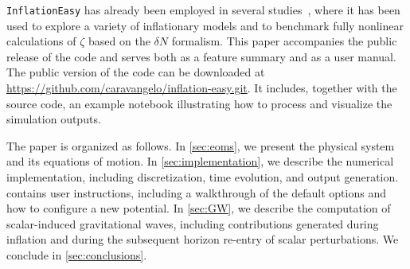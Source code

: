 \documentclass[aps, nofootinbib,superscriptaddress, preprintnumbers, longbibliography]{article}
\begin{document}
\texttt{InflationEasy} has already been employed in several studies~\cite{Caravano:2021pgc,Caravano:2022yyv,Caravano:2024tlp,Caravano:2024moy,Caravano:2025diq,gwpaper}, where it has been used to explore a variety of inflationary models and to benchmark fully nonlinear calculations of $\zeta$ based on the $\delta N$ formalism. This paper accompanies the public release of the code and serves both as a feature summary and as a user manual. The public version of the code can be downloaded at \href{https://github.com/caravangelo/inflation-easy.git}{https://github.com/caravangelo/inflation-easy.git}. It includes, together with the source code, an example notebook illustrating how to process and visualize the simulation outputs.

The paper is organized as follows. In \cref{sec:eoms}, we present the physical system and its equations of motion. In \cref{sec:implementation}, we describe the numerical implementation, including discretization, time evolution, and output generation.  contains user instructions, including a walkthrough of the default options and how to configure a new potential. In \cref{sec:GW}, we describe the computation of scalar-induced gravitational waves, including contributions generated during inflation and during the subsequent horizon re-entry of scalar perturbations. We conclude in \cref{sec:conclusions}.
\end{document}
